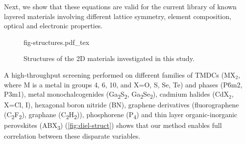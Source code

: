 Next, we show that these equations are valid for the current
library of known layered materials involving different lattice
symmetry, element composition, optical and electronic properties.
%
\begin{figure}[!htbp]
\centering
{fig-structures.pdf_tex}
\caption{\label{fig:diel-struct}
  Structures of the 2D
  materials investigated in this study.}
\end{figure}
%
A high-throughput screening performed on different families of TMDCs
(MX\(_{\text{2}}\), where M is a metal in groups 4, 6, 10, and X=O, S,
Se, Te) and phases (P\={6}m2, P3m1), metal monochalcogenides
(Ga\textsubscript{2}S\textsubscript{2},
Ga\textsubscript{2}Se\textsubscript{2}), cadmium halides (CdX$_2$,
X=Cl, I), hexagonal boron nitride (BN), graphene derivatives
(fluorographene (C\textsubscript{2}F\textsubscript{2}), graphane
(C\textsubscript{2}H\textsubscript{2})), phosphorene
(P\textsubscript{4}) and thin layer organic-inorganic perovskites
(ABX\textsubscript{3}) (\autoref{fig:diel-struct}) shows that our
method enables full correlation between these disparate variables.

